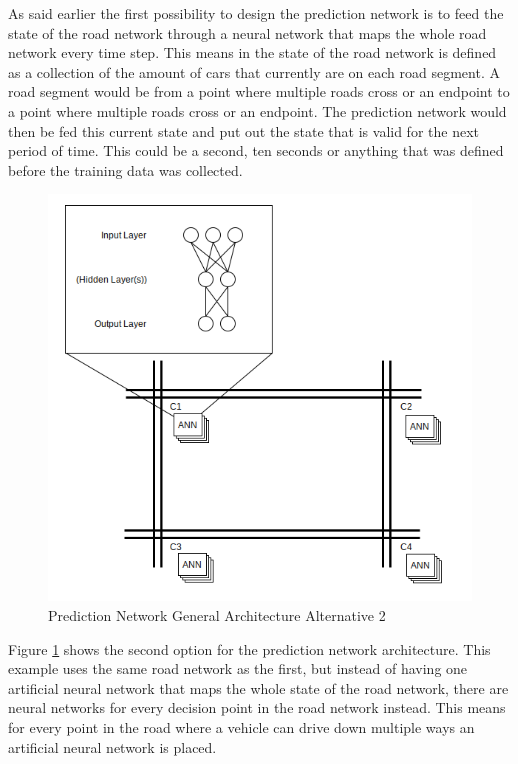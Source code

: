 As said earlier the first possibility to design the prediction network is to feed the state of the road network through a neural network that maps the whole road network every time step. This means in the state of the road network is defined as a collection of the amount of cars that currently are on each road segment. A road segment would be from a point where multiple roads cross or an endpoint to a point where multiple roads cross or an endpoint. The prediction network would then be fed this current state and put out the state that is valid for the next period of time. This could be a second, ten seconds or anything that was defined before the training data was collected.

\begin{figure}[!ht]
  \centering
  \includegraphics[width=16cm]{figures/predictionNetworkAlt2}
  \caption[Prediction Network General Architecture Alternative 2]{Prediction Network General Architecture Alternative 2 \protect\footnotemark}
  \label{predictionNetworkAlt2}
\end{figure}


Figure \ref{predictionNetworkAlt2} shows the second option for the prediction network architecture. This example uses the same road network as the first, but instead of having one artificial neural network that maps the whole state of the road network, there are neural networks for every decision point in the road network instead. This means for every point in the road where a vehicle can drive down multiple ways an artificial neural network is placed.

